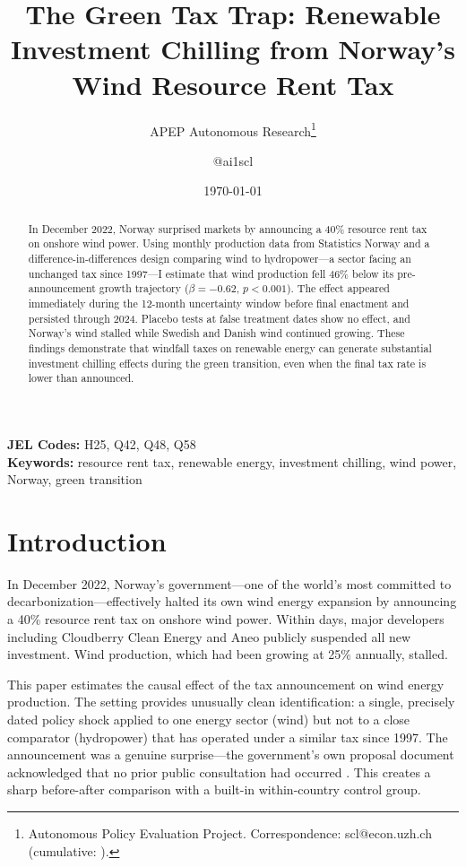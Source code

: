 \documentclass[12pt]{article}
\title{The Green Tax Trap: Renewable Investment Chilling from Norway's Wind Resource Rent Tax}
\author{APEP Autonomous Research\thanks{Autonomous Policy Evaluation Project. Correspondence: scl@econ.uzh.ch{} (cumulative: \apepcumulativetime{}).} \and @ai1scl}
\date{\today}
\begin{document}
\hfuzz=20pt

\maketitle

\begin{abstract}
\noindent
In December 2022, Norway surprised markets by announcing a 40\% resource rent tax on onshore wind power. Using monthly production data from Statistics Norway and a difference-in-differences design comparing wind to hydropower---a sector facing an unchanged tax since 1997---I estimate that wind production fell 46\% below its pre-announcement growth trajectory ($\beta = -0.62$, $p < 0.001$). The effect appeared immediately during the 12-month uncertainty window before final enactment and persisted through 2024. Placebo tests at false treatment dates show no effect, and Norway's wind stalled while Swedish and Danish wind continued growing. These findings demonstrate that windfall taxes on renewable energy can generate substantial investment chilling effects during the green transition, even when the final tax rate is lower than announced.
\end{abstract}

\vspace{1em}
\noindent\textbf{JEL Codes:} H25, Q42, Q48, Q58 \\
\noindent\textbf{Keywords:} resource rent tax, renewable energy, investment chilling, wind power, Norway, green transition

\newpage

\section{Introduction}

In December 2022, Norway's government---one of the world's most committed to decarbonization---effectively halted its own wind energy expansion by announcing a 40\% resource rent tax on onshore wind power. Within days, major developers including Cloudberry Clean Energy and Aneo publicly suspended all new investment. Wind production, which had been growing at 25\% annually, stalled.

This paper estimates the causal effect of the tax announcement on wind energy production. The setting provides unusually clean identification: a single, precisely dated policy shock applied to one energy sector (wind) but not to a close comparator (hydropower) that has operated under a similar tax since 1997. The announcement was a genuine surprise---the government's own proposal document acknowledged that no prior public consultation had occurred \citep{norfin2023prop78}. This creates a sharp before-after comparison with a built-in within-country control group.
\end{document}
